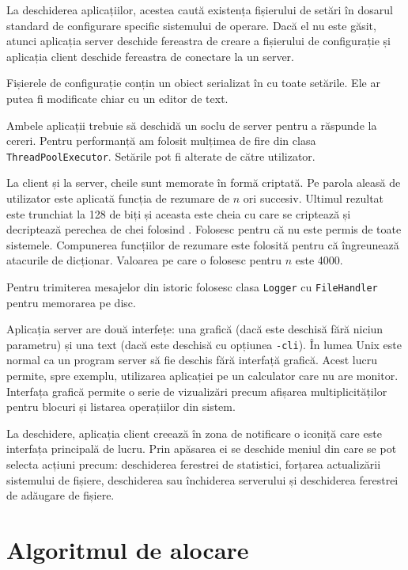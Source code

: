 \documentclass[a4wide,12pt]{report}
\newcommand{\cod}[1]{\texttt{#1}}
\newcommand{\acr}[1]{{\textsmaller[1]{\textsc{#1}}}} %
\begin{document}
La deschiderea aplicațiilor, acestea caută existența fișierului de setări în dosarul standard de configurare specific
sistemului de operare. Dacă el nu este găsit, atunci aplicația server deschide fereastra de creare a fișierului de
configurație și aplicația client deschide fereastra de conectare la un server.

Fișierele de configurație conțin un obiect serializat în \acr{JSON} cu toate setările. Ele ar putea fi modificate chiar
cu un editor de text.

Ambele aplicații trebuie să deschidă un soclu de server pentru a răspunde la cereri. Pentru performanță am folosit
mulțimea de fire din clasa \cod{ThreadPoolExecutor}. Setările pot fi alterate de către utilizator.

La client și la server, cheile sunt memorate în formă criptată. Pe parola aleasă de utilizator este aplicată funcția de
rezumare \acr{SHA-256} de $n$ ori succesiv. Ultimul rezultat este trunchiat la 128 de biți și aceasta este cheia cu care
se criptează și decriptează perechea de chei folosind \acr{AES-128}. Folosesc \acr{AES-128} pentru că \acr{AES-256} nu
este permis de toate sistemele. Compunerea funcțiilor de rezumare este folosită pentru că îngreunează atacurile de
dicționar. Valoarea pe care o folosesc pentru $n$ este 4000.

Pentru trimiterea mesajelor din istoric folosesc clasa \cod{Logger} cu \cod{FileHandler} pentru memorarea pe disc.

Aplicația server are două interfețe: una grafică (dacă este deschisă fără niciun parametru) și una text (dacă este
deschisă cu opțiunea \cod{-cli}). În lumea Unix este normal ca un program server să fie deschis fără interfață grafică.
Acest lucru permite, spre exemplu, utilizarea aplicației pe un calculator care nu are monitor.  Interfața grafică
permite o serie de vizualizări precum afișarea multiplicităților pentru blocuri și listarea operațiilor din sistem.

La deschidere, aplicația client creează în zona de notificare o iconiță care este interfața principală de lucru. Prin
apăsarea ei se deschide meniul din care se pot selecta acțiuni precum: deschiderea ferestrei de statistici, forțarea
actualizării sistemului de fișiere, deschiderea sau închiderea serverului \acr{FTP} și deschiderea ferestrei de adăugare
de fișiere.

\section{Algoritmul de alocare} %
\label{sec:algaloc}
\end{document}

